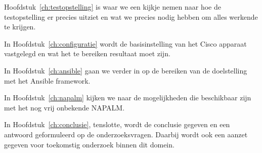 Hoofdstuk~\ref{ch:testopstelling} is waar we een kijkje nemen naar hoe de testopstelling er precies uitziet en wat we precies nodig hebben om alles werkende te krijgen.

In Hoofdstuk~\ref{ch:configuratie} wordt de basisinstelling van het Cisco apparaat vastgelegd en wat het te bereiken resultaat moet zijn. 

In Hoofdstuk~\ref{ch:ansible} gaan we verder in op de bereiken van de doelstelling met het Ansible framework. 

In Hoofdstuk~\ref{ch:napalm} kijken we naar de mogelijkheden die beschikbaar zijn met het nog vrij onbekende NAPALM. 

In Hoofdstuk~\ref{ch:conclusie}, tenslotte, wordt de conclusie gegeven en een antwoord geformuleerd op de onderzoeksvragen. Daarbij wordt ook een aanzet gegeven voor toekomstig onderzoek binnen dit domein.

